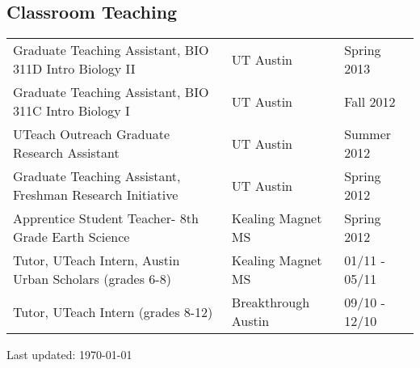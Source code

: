 \documentclass[letterpaper]{article}
\begin{document}
\subsection*{Classroom Teaching}
\begin{tabular}{lll}
Graduate Teaching Assistant, BIO 311D Intro Biology II	& UT Austin		& Spring 2013 \\
Graduate Teaching Assistant, BIO 311C Intro Biology I	& UT Austin		& Fall 2012 \\
UTeach Outreach Graduate Research Assistant			& UT Austin		& Summer 2012 \\
Graduate Teaching Assistant, Freshman Research Initiative	& UT Austin		& Spring 2012 \\
Apprentice Student Teacher- 8th Grade Earth Science	& Kealing Magnet MS	& Spring 2012 \\
Tutor, UTeach Intern, Austin Urban Scholars (grades 6-8)& Kealing Magnet MS	& 01/11 - 05/11 \\
Tutor, UTeach Intern (grades 8-12)			& Breakthrough Austin	& 09/10 - 12/10 \\
\end{tabular}



\bigskip

\begin{center}
  \begin{footnotesize}
    Last updated: \today \\
  \end{footnotesize}
\end{center}
\end{document}
